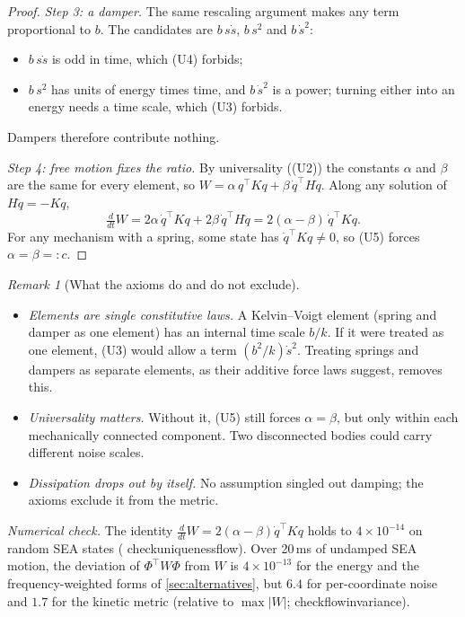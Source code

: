 \documentclass[11pt]{article}
\theoremstyle{definition}
\theoremstyle{remark}
\newtheorem{remark}[theorem]{Remark}
\newcommand{\codeus}{\textunderscore\allowbreak}
\newcommand{\code}[1]{{\ttfamily\let\_\codeus\hyphenchar\font=-1 #1}}
\newcommand{\checked}[1]{\par\smallskip\noindent\textit{Numerical check.} #1\par}
\begin{document}
\begin{proof}
\emph{Step 3: a damper.} The same rescaling argument makes any term proportional to $b$.
The candidates are $b\,s\dot s$, $b\,s^2$ and $b\,\dot s^2$:
\begin{itemize}[nosep]
  \item $b\,s\dot s$ is odd in time, which (U4) forbids;
  \item $b\,s^2$ has units of energy times time, and $b\,\dot s^2$ is a power; turning
        either into an energy needs a time scale, which (U3) forbids.
\end{itemize}
Dampers therefore contribute nothing.

\emph{Step 4: free motion fixes the ratio.} By universality ((U2)) the constants $\alpha$
and $\beta$ are the same for every element, so $W=\alpha\,q^\top Kq+\beta\,\dot q^\top
H\dot q$. Along any solution of $H\ddot q=-Kq$,
\[
  \tfrac{d}{dt}W=2\alpha\,\dot q^\top Kq+2\beta\,\dot q^\top H\ddot q
  =2(\alpha-\beta)\,\dot q^\top Kq .
\]
For any mechanism with a spring, some state has $\dot q^\top Kq\neq0$, so (U5) forces
$\alpha=\beta=:c$.
\end{proof}

\begin{remark}[What the axioms do and do not exclude]
\begin{itemize}[nosep]
  \item \emph{Elements are single constitutive laws.} A Kelvin--Voigt element (spring and
        damper as one element) has an internal time scale $b/k$. If it were treated as one
        element, (U3) would allow a term $(b^2/k)\dot s^2$. Treating springs and dampers as
        separate elements, as their additive force laws suggest, removes this.
  \item \emph{Universality matters.} Without it, (U5) still forces $\alpha=\beta$, but only
        within each mechanically connected component. Two disconnected bodies could carry
        different noise scales.
  \item \emph{Dissipation drops out by itself.} No assumption singled out damping; the
        axioms exclude it from the metric.
\end{itemize}
\end{remark}

\checked{The identity $\frac{d}{dt}W=2(\alpha-\beta)\dot q^\top Kq$ holds to
$4\times10^{-14}$ on random SEA states (\code{check\_uniqueness\_flow}). Over 20\,ms of
undamped SEA motion, the deviation of $\Phi^\top W\Phi$ from $W$ is $4\times10^{-13}$ for
the energy and the frequency-weighted forms of \cref{sec:alternatives}, but $6.4$ for
per-coordinate noise and $1.7$ for the kinetic metric (relative to $\max|W|$;
\code{check\_flow\_invariance}).}
\end{document}
